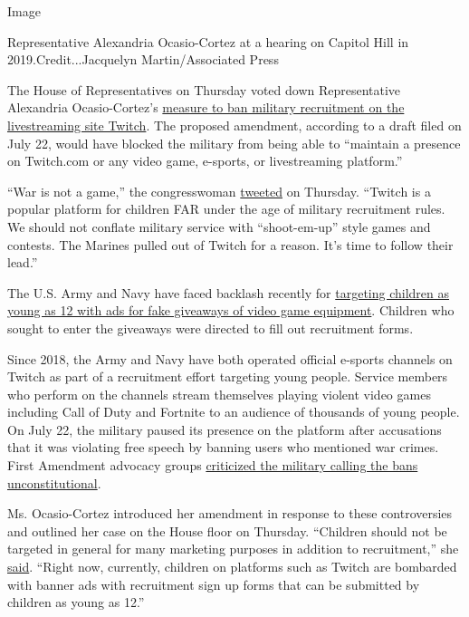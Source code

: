 Image

Representative Alexandria Ocasio-Cortez at a hearing on Capitol Hill in
2019.Credit...Jacquelyn Martin/Associated Press

The House of Representatives on Thursday voted down Representative
Alexandria Ocasio-Cortez's
\href{https://www.vice.com/en_us/article/889vbv/aoc-introduces-measure-to-stop-the-military-from-recruiting-on-twitch}{measure
to ban military recruitment on the livestreaming site Twitch}. The
proposed amendment, according to a draft filed on July 22, would have
blocked the military from being able to ``maintain a presence on
Twitch.com or any video game, e-sports, or livestreaming platform.''

``War is not a game,'' the congresswoman
\href{https://twitter.com/AOC/status/1288869264640835585}{tweeted} on
Thursday. ``Twitch is a popular platform for children FAR under the age
of military recruitment rules. We should not conflate military service
with ``shoot-em-up'' style games and contests. The Marines pulled out of
Twitch for a reason. It's time to follow their lead.''

The U.S. Army and Navy have faced backlash recently for
\href{https://www.theverge.com/2020/7/17/21328130/us-army-twitch-esports-gaming-recruitment-fake-prize-giveaway}{targeting
children as young as 12 with ads for fake giveaways of video game
equipment}. Children who sought to enter the giveaways were directed to
fill out recruitment forms.

Since 2018, the Army and Navy have both operated official e-sports
channels on Twitch as part of a recruitment effort targeting young
people. Service members who perform on the channels stream themselves
playing violent video games including Call of Duty and Fortnite to an
audience of thousands of young people. On July 22, the military paused
its presence on the platform after accusations that it was violating
free speech by banning users who mentioned war crimes. First Amendment
advocacy groups
\href{https://www.nytimes3xbfgragh.onion/2020/07/22/style/army-gamers-war-crimes-first-amendment.html}{criticized
the military calling the bans unconstitutional}.

Ms. Ocasio-Cortez introduced her amendment in response to these
controversies and outlined her case on the House floor on Thursday.
``Children should not be targeted in general for many marketing purposes
in addition to recruitment,'' she
\href{https://twitter.com/Slasher/status/1288896196073918465}{said}.
``Right now, currently, children on platforms such as Twitch are
bombarded with banner ads with recruitment sign up forms that can be
submitted by children as young as 12.''

